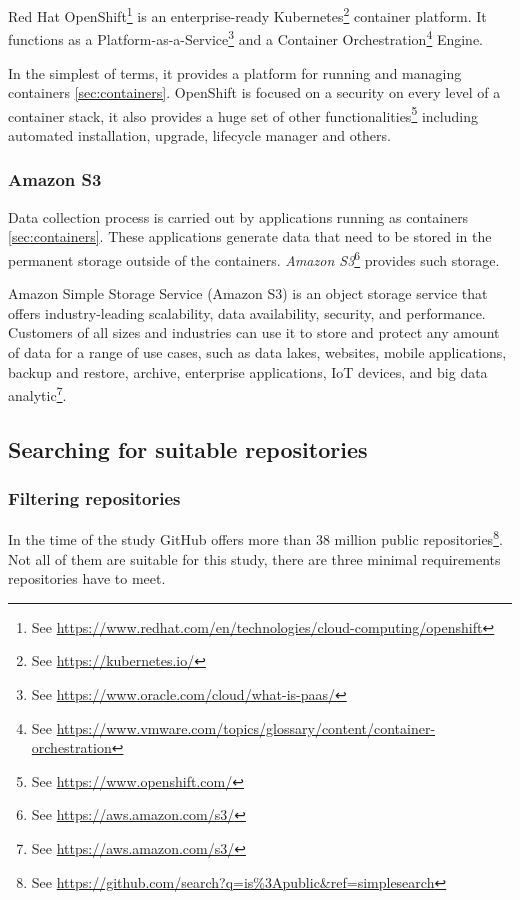 Red Hat OpenShift\footnote{See \url{https://www.redhat.com/en/technologies/cloud-computing/openshift}} is an enterprise-ready Kubernetes\footnote{See \url{https://kubernetes.io/}} container platform.
It functions as a Platform-as-a-Service\footnote{See \url{https://www.oracle.com/cloud/what-is-paas/}} and a Container Orchestration\footnote{See \url{https://www.vmware.com/topics/glossary/content/container-orchestration}} Engine.

In the simplest of terms, it provides a platform for running and managing containers \ref{sec:containers}.
OpenShift is focused on a security on every level of a container stack, it also provides a huge set of other functionalities\footnote{See \url{https://www.openshift.com/}} including automated installation, upgrade, lifecycle manager and others.

\subsubsection{Amazon S3}
\label{sec:s3}

Data collection process is carried out by applications running as containers \ref{sec:containers}.
These applications generate data that need to be stored in the permanent storage outside of the containers.
\emph{Amazon S3}\footnote{See \url{https://aws.amazon.com/s3/}} provides such storage.

Amazon Simple Storage Service (Amazon S3) is an object storage service that offers industry-leading scalability, data availability, security, and performance.
Customers of all sizes and industries can use it to store and protect any amount of data for a range of use cases, such as data lakes, websites, mobile applications, backup and restore, archive, enterprise applications, IoT devices, and big data analytic\footnote{See \url{https://aws.amazon.com/s3/}}.

\subsection{Searching for suitable repositories}

\subsubsection{Filtering repositories}
\label{sec:filtering}

In the time of the study GitHub offers more than 38 million public repositories\footnote{See \url{https://github.com/search?q=is\%3Apublic\&ref=simplesearch}}.
Not all of them are suitable for this study, there are three minimal requirements repositories have to meet.


